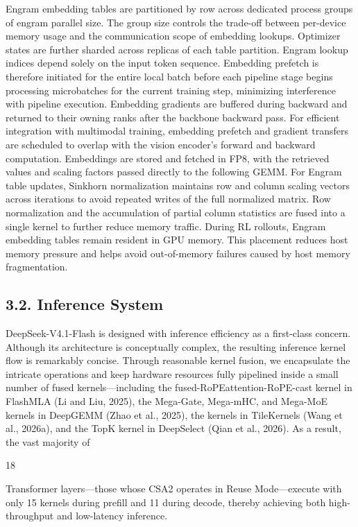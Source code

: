 \documentclass[
  10
]{article}
\begin{document}
Engram embedding tables are partitioned by row across dedicated process
groups of engram parallel size. The group size controls the trade-off
between per-device memory usage and the communication scope of embedding
lookups. Optimizer states are further sharded across replicas of each
table partition. Engram lookup indices depend solely on the input token
sequence. Embedding prefetch is therefore initiated for the entire local
batch before each pipeline stage begins processing microbatches for the
current training step, minimizing interference with pipeline execution.
Embedding gradients are buffered during backward and returned to their
owning ranks after the backbone backward pass. For efficient integration
with multimodal training, embedding prefetch and gradient transfers are
scheduled to overlap with the vision encoder's forward and backward
computation. Embeddings are stored and fetched in FP8, with the
retrieved values and scaling factors passed directly to the following
GEMM. For Engram table updates, Sinkhorn normalization maintains row and
column scaling vectors across iterations to avoid repeated writes of the
full normalized matrix. Row normalization and the accumulation of
partial column statistics are fused into a single kernel to further
reduce memory traffic. During RL rollouts, Engram embedding tables
remain resident in GPU memory. This placement reduces host memory
pressure and helps avoid out-of-memory failures caused by host memory
fragmentation.

\subsection{3.2. Inference System}\label{inference-system}

DeepSeek-V4.1-Flash is designed with inference efficiency as a
first-class concern. Although its architecture is conceptually complex,
the resulting inference kernel flow is remarkably concise. Through
reasonable kernel fusion, we encapsulate the intricate operations and
keep hardware resources fully pipelined inside a small number of fused
kernels---including the fused-RoPEattention-RoPE-cast kernel in FlashMLA
(Li and Liu, 2025), the Mega-Gate, Mega-mHC, and Mega-MoE kernels in
DeepGEMM (Zhao et al., 2025), the kernels in TileKernels (Wang et al.,
2026a), and the TopK kernel in DeepSelect (Qian et al., 2026). As a
result, the vast majority of

18

Transformer layers---those whose CSA2 operates in Reuse Mode---execute
with only 15 kernels during prefill and 11 during decode, thereby
achieving both high-throughput and low-latency inference.
\end{document}
